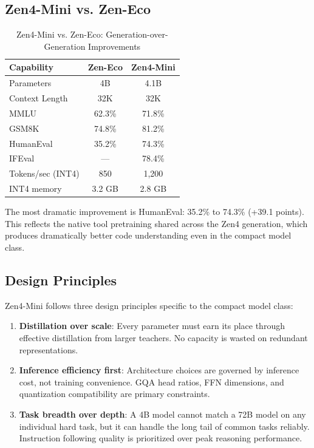 \documentclass[11pt,a4paper]{article}
\begin{document}
\subsection{Zen4-Mini vs. Zen-Eco}

\begin{table}[H]
\centering
\begin{tabular}{lcc}
\toprule
\textbf{Capability} & \textbf{Zen-Eco} & \textbf{Zen4-Mini} \\
\midrule
Parameters          & 4B    & 4.1B \\
Context Length      & 32K   & 32K \\
MMLU                & 62.3\% & 71.8\% \\
GSM8K               & 74.8\% & 81.2\% \\
HumanEval           & 35.2\% & 74.3\% \\
IFEval              & ---    & 78.4\% \\
Tokens/sec (INT4)   & 850   & 1,200 \\
INT4 memory         & 3.2 GB & 2.8 GB \\
\bottomrule
\end{tabular}
\caption{Zen4-Mini vs. Zen-Eco: Generation-over-Generation Improvements}
\end{table}

The most dramatic improvement is HumanEval: 35.2\% to 74.3\% (+39.1 points). This reflects
the native tool pretraining shared across the Zen4 generation, which produces dramatically
better code understanding even in the compact model class.

\subsection{Design Principles}

Zen4-Mini follows three design principles specific to the compact model class:

\begin{enumerate}
    \item \textbf{Distillation over scale}: Every parameter must earn its place through
    effective distillation from larger teachers. No capacity is wasted on redundant
    representations.
    \item \textbf{Inference efficiency first}: Architecture choices are governed by
    inference cost, not training convenience. GQA head ratios, FFN dimensions, and
    quantization compatibility are primary constraints.
    \item \textbf{Task breadth over depth}: A 4B model cannot match a 72B model on
    any individual hard task, but it can handle the long tail of common tasks reliably.
    Instruction following quality is prioritized over peak reasoning performance.
\end{enumerate}
\end{document}
